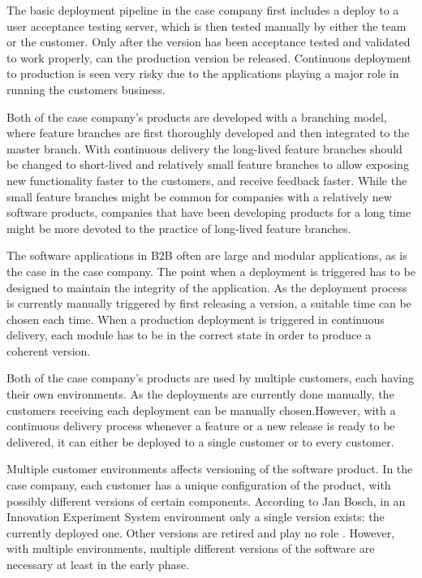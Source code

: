 \documentclass[lnbip]{svmultln}
\begin{document}
The basic deployment pipeline in the case company first includes a deploy to a user acceptance testing server, which is then tested manually by either the team or the customer. Only after the version has been acceptance tested and validated to work properly, can the production version be released. Continuous deployment to production is seen very risky due to the applications playing a major role in running the customers business. 

Both of the case company's products are developed with a branching model, where feature branches are first thoroughly developed and then integrated to the master branch. With continuous delivery the long-lived feature branches should be changed to short-lived and relatively small feature branches to allow exposing new functionality faster to the customers, and receive feedback faster. While the small feature branches might be common for companies with a relatively new software products, companies that have been developing products for a long time might be more devoted to the practice of long-lived feature branches. %

The software applications in B2B often are large and modular applications, as is the case in the case company. The point when a deployment is triggered has to be designed to maintain the integrity of the application. As the deployment process is currently manually triggered by first releasing a version, a suitable time can be chosen each time. When a production deployment is triggered in continuous delivery, each module has to be in the correct state in order to produce a coherent version.

Both of the case company's products are used by multiple customers, each having their own environments. As the deployments are currently done manually, the customers receiving each deployment can be manually chosen.However, with a continuous delivery process whenever a feature or a new release is ready to be delivered, it can either be deployed to a single customer or to every customer. 

Multiple customer environments affects versioning of the software product. In the case company, each customer has a unique configuration of the product, with possibly different versions of certain components. According to Jan Bosch, in an Innovation Experiment System environment only a single version exists: the currently deployed one. Other versions are retired and play no role \cite{bosch2012building}. However, with multiple environments, multiple different versions of the software are necessary at least in the early phase. 
\end{document}
